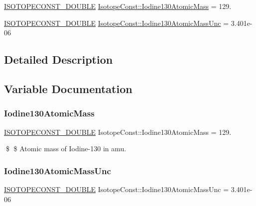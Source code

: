 \begin{DoxyCompactItemize}
\item 
\mbox{\hyperlink{group___isotope_const-_macros_ga8f45a7272ce02c0b4c65c44636ed719a}{I\+S\+O\+T\+O\+P\+E\+C\+O\+N\+S\+T\+\_\+\+D\+O\+U\+B\+LE}} \mbox{\hyperlink{group___isotope_const-_iodine-_i130_gadd4c7ccac82a98418de5f22f2a97c894}{Isotope\+Const\+::\+Iodine130\+Atomic\+Mass}} = 129.
\item 
\mbox{\hyperlink{group___isotope_const-_macros_ga8f45a7272ce02c0b4c65c44636ed719a}{I\+S\+O\+T\+O\+P\+E\+C\+O\+N\+S\+T\+\_\+\+D\+O\+U\+B\+LE}} \mbox{\hyperlink{group___isotope_const-_iodine-_i130_ga74714bc3e7c0bc31f809520a71955c72}{Isotope\+Const\+::\+Iodine130\+Atomic\+Mass\+Unc}} = 3.\+401e-\/06
\end{DoxyCompactItemize}


\subsection{Detailed Description}


\subsection{Variable Documentation}
\mbox{\label{group___isotope_const-_iodine-_i130_gadd4c7ccac82a98418de5f22f2a97c894}} 
\subsubsection{\texorpdfstring{Iodine130\+Atomic\+Mass}{Iodine130AtomicMass}}
{\footnotesize\ttfamily \mbox{\hyperlink{group___isotope_const-_macros_ga8f45a7272ce02c0b4c65c44636ed719a}{I\+S\+O\+T\+O\+P\+E\+C\+O\+N\+S\+T\+\_\+\+D\+O\+U\+B\+LE}} Isotope\+Const\+::\+Iodine130\+Atomic\+Mass = 129.}

\$ \$ Atomic mass of Iodine-\/130 in amu. \mbox{\label{group___isotope_const-_iodine-_i130_ga74714bc3e7c0bc31f809520a71955c72}} 
\subsubsection{\texorpdfstring{Iodine130\+Atomic\+Mass\+Unc}{Iodine130AtomicMassUnc}}
{\footnotesize\ttfamily \mbox{\hyperlink{group___isotope_const-_macros_ga8f45a7272ce02c0b4c65c44636ed719a}{I\+S\+O\+T\+O\+P\+E\+C\+O\+N\+S\+T\+\_\+\+D\+O\+U\+B\+LE}} Isotope\+Const\+::\+Iodine130\+Atomic\+Mass\+Unc = 3.\+401e-\/06}

